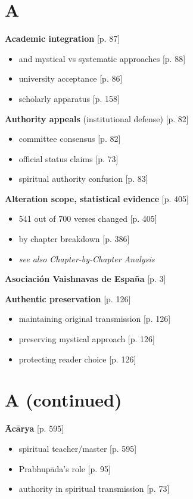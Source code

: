 \documentclass[11pt,twoside]{book}
\begin{document}
\section*{A}
\label{sec:orgf483f39}

\textbf{\textbf{Academic integration}} {[}p. 87]
\begin{itemize}
\item and mystical vs systematic approaches [p. 88]
\item university acceptance [p. 86]
\item scholarly apparatus [p. 158]
\end{itemize}

\textbf{\textbf{Authority appeals}} (institutional defense) [p. 82]
\begin{itemize}
\item committee consensus [p. 82]
\item official status claims [p. 73]
\item spiritual authority confusion [p. 83]
\end{itemize}

\textbf{\textbf{Alteration scope, statistical evidence}} {[}p. 405]
\begin{itemize}
\item 541 out of 700 verses changed [p. 405]
\item by chapter breakdown [p. 386]
\item \emph{see also Chapter-by-Chapter Analysis}
\end{itemize}

\textbf{\textbf{Asociación Vaishnavas de España}} {[}p. 3]

\textbf{\textbf{Authentic preservation}} {[}p. 126]
\begin{itemize}
\item maintaining original transmission [p. 126]
\item preserving mystical approach [p. 126]
\item protecting reader choice [p. 126]
\end{itemize}
\section*{A (continued)}
\label{sec:orge0e49d4}

\textbf{\textbf{Ācārya}} {[}p. 595]
\begin{itemize}
\item spiritual teacher/master [p. 595]
\item Prabhupāda's role [p. 95]
\item authority in spiritual transmission [p. 73]
\end{itemize}
\end{document}
